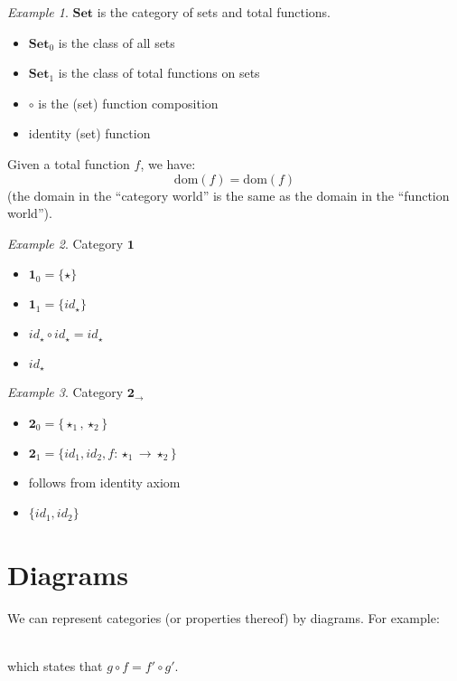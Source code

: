 \documentclass[fleqn]{scrartcl}
\newenvironment{category}{\begin{itemize}[leftmargin=.9in]}{\end{itemize}}
\newcommand{\catobj}[1]{\item[\textbf{Object}] #1}
\newcommand{\catarr}[1]{\item[\textbf{Arrows}] #1}
\newcommand{\catcomp}[1]{\item[\textbf{Comp.}] #1}
\newcommand{\catid}[1]{\item[\textbf{Ident.}] #1}
\newcommand{\ccat}[1]{\mathbf{#1}}
\newcommand{\dom}{\mathrm{dom}}
\theoremstyle{definition} \newtheorem{definition}{Definition}
\theoremstyle{remark} \newtheorem{example}{Example}
\begin{document}
\begin{example}
  $\ccat{Set}$ is the category of sets and total functions.
  \begin{category}
    \catobj{$\ccat{Set}_0$ is the class of all sets}
    \catarr{$\ccat{Set}_1$ is the class of total functions on sets}
    \catcomp{$\circ$ is the (set) function composition}
    \catid{identity (set) function}
  \end{category}
  Given a total function $f$, we have:
  \[ \dom(f) = \dom(f) \]
  (the domain in the ``category world'' is the same as the domain in
  the ``function world'').
\end{example}

\begin{example}
  Category $\ccat{1}$
  \begin{category}
    \catobj{$\ccat{1}_0 = \{ \star \}$}
    \catarr{$\ccat{1}_1 = \{ id_\star \}$}
    \catcomp{$id_\star \circ id_\star = id_\star$}
    \catid{$id_\star$}
  \end{category}
\end{example}

\begin{example}
  Category $\ccat{2}_\to$
  \begin{category}
    \catobj{$\ccat{2}_0 = \{ \star_1, \star_2 \}$}
    \catarr{$\ccat{2}_1 = \{ id_1, id_2, f : \star_1 \to \star_2 \}$}
    \catcomp{follows from identity axiom}
    \catid{$\{ id_1, id_2 \}$}
  \end{category}
\end{example}

\section{Diagrams}
We can represent categories (or properties thereof) by diagrams. For
example:

\\
which states that $g \circ f = f' \circ g'$.
\end{document}
